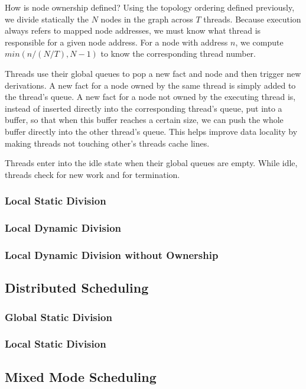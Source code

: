 \documentclass[preprint]{sigplanconf}
\begin{document}
How is node ownership defined? Using the topology ordering defined previously, we divide
statically the $N$ nodes in the graph across $T$ threads. Because execution
always refers to mapped node addresses, we must know what thread is responsible for a given
node address. For a node with address $n$, we compute $min(n / (N/T), N-1)$ to know
the corresponding thread number.

Threads use their global queues to pop a new fact and node and then trigger new derivations.
A new fact for a node owned by the same thread is simply added to the thread's queue.
A new fact for a node not owned by the executing thread is, instead of inserted directly
into the corresponding thread's queue, put into a buffer, so that when this buffer reaches
a certain size, we can push the whole buffer directly into the other thread's queue.
This helps improve data locality by making threads not touching other's threads cache lines.

Threads enter into the idle state when their global queues are empty. While idle, threads
check for new work and for termination.

\subsubsection{Local Static Division}
\subsubsection{Local Dynamic Division}
\subsubsection{Local Dynamic Division without Ownership}

\subsection{Distributed Scheduling}

\subsubsection{Global Static Division}
\subsubsection{Local Static Division}

\subsection{Mixed Mode Scheduling}
\end{document}
